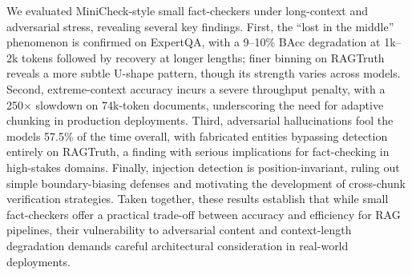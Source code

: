 \documentclass{article}
\begin{document}
We evaluated MiniCheck-style small fact-checkers under long-context and adversarial stress, revealing several key findings. First, the ``lost in the middle'' phenomenon is confirmed on ExpertQA, with a 9--10\% BAcc degradation at 1k--2k tokens followed by recovery at longer lengths; finer binning on RAGTruth reveals a more subtle U-shape pattern, though its strength varies across models. Second, extreme-context accuracy incurs a severe throughput penalty, with a 250× slowdown on 74k-token documents, underscoring the need for adaptive chunking in production deployments. Third, adversarial hallucinations fool the models 57.5\% of the time overall, with fabricated entities bypassing detection entirely on RAGTruth, a finding with serious implications for fact-checking in high-stakes domains. Finally, injection detection is position-invariant, ruling out simple boundary-biasing defenses and motivating the development of cross-chunk verification strategies. Taken together, these results establish that while small fact-checkers offer a practical trade-off between accuracy and efficiency for RAG pipelines, their vulnerability to adversarial content and context-length degradation demands careful architectural consideration in real-world deployments.



\end{document}
